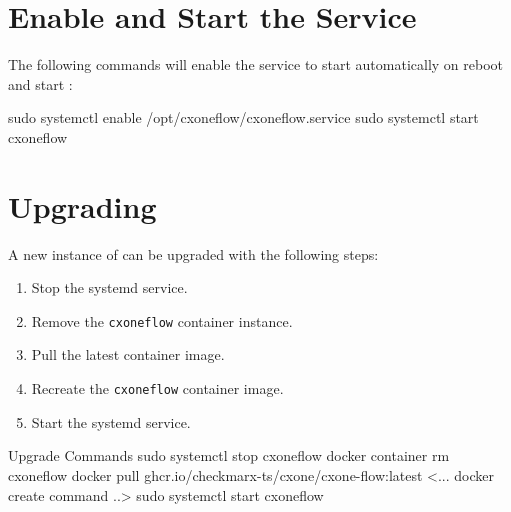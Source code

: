 \section{Enable and Start the \cxoneflowtext Service}

The following commands will enable the service to start automatically 
on reboot and start \cxoneflow:

\begin{code}{}{}{}
sudo systemctl enable /opt/cxoneflow/cxoneflow.service
sudo systemctl start cxoneflow
\end{code}

\section{Upgrading}

A new instance of \cxoneflow can be upgraded with the following steps:

\begin{enumerate}
  \item Stop the \cxoneflow systemd service.
  \item Remove the \texttt{cxoneflow} container instance.
  \item Pull the latest \cxoneflow container image.
  \item Recreate the \texttt{cxoneflow} container image.
  \item Start the \cxoneflow systemd service.
\end{enumerate}



\begin{code}{Upgrade Commands}{}{}
  sudo systemctl stop cxoneflow
  docker container rm cxoneflow
  docker pull ghcr.io/checkmarx-ts/cxone/cxone-flow:latest
  <... docker create command ..>
  sudo systemctl start cxoneflow
\end{code}
 


